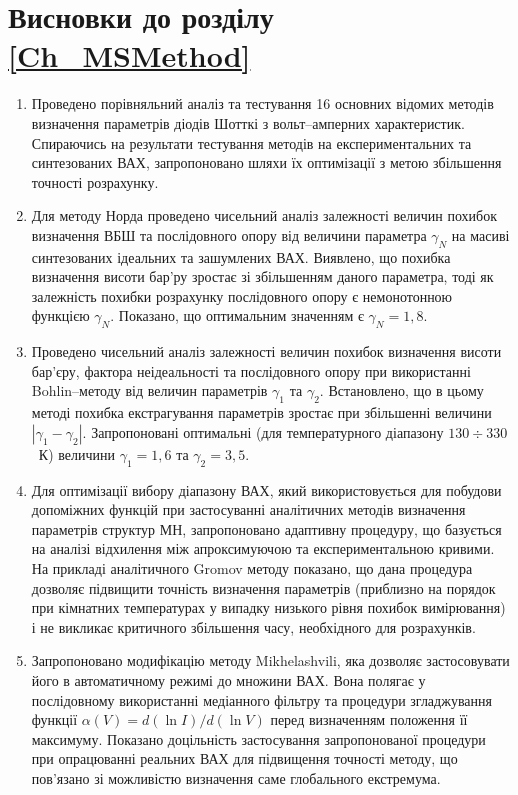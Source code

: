 \section*{Висновки до розділу \ref{Ch_MSMethod}}
  \begin{enumerate}[leftmargin=0cm,itemindent=3em]
     \item Проведено порівняльний аналіз та тестування 16 основних відомих методів визначення параметрів діодів Шотткі з вольт--амперних характеристик.
         Спираючись на результати тестування методів на експериментальних та синтезованих  ВАХ,
         запропоновано шляхи їх оптимізації з метою збільшення точності розрахунку.

     \item Для методу Норда проведено чисельний аналіз залежності величин похибок визначення ВБШ та послідовного опору від величини параметра $\gamma_N$ на масиві синтезованих ідеальних та зашумлених ВАХ.
     Виявлено, що похибка визначення висоти бар'ру зростає зі збільшенням даного параметра, тоді як залежність похибки розрахунку послідовного опору є немонотонною функцією $\gamma_N$.
     Показано, що оптимальним значенням є $\gamma_N=1,8$.


     \item Проведено чисельний аналіз залежності величин похибок визначення висоти бар'єру, фактора неідеальності та послідовного опору при використанні Bohlin--методу від величин параметрів $\gamma_1$ та $\gamma_2$.
     Встановлено, що в цьому методі похибка екстрагування параметрів зростає при збільшенні величини $|\gamma_1-\gamma_2|$.
     Запропоновані оптимальні (для температурного діапазону $130\div330$~К) величини $\gamma_1=1,6$ та $\gamma_2=3,5$.



     \item Для оптимізації вибору діапазону ВАХ, який використовується для побудови допоміжних функцій при застосуванні аналітичних методів визначення параметрів структур МН, запропоновано адаптивну процедуру, що базується на аналізі відхилення між апроксимуючою та експериментальною кривими.
         На прикладі аналітичного Gromov методу показано, що дана процедура дозволяє підвищити точність визначення параметрів (приблизно на порядок при кімнатних температурах у випадку низького рівня похибок вимірювання) і не викликає критичного збільшення часу, необхідного для розрахунків.

     \item Запропоновано модифікацію методу Mikhelashvili, яка дозволяє застосовувати його в автоматичному режимі до множини ВАХ.
     Вона полягає у послідовному використанні медіанного фільтру та процедури згладжування функції $\alpha(V)=d(\ln I)/d(\ln V)$ перед визначенням положення її максимуму.
     Показано доцільність застосування запропонованої процедури при опрацюванні реальних ВАХ для підвищення точності методу, що пов'язано зі можливістю визначення саме глобального екстремума.


\end{enumerate}
